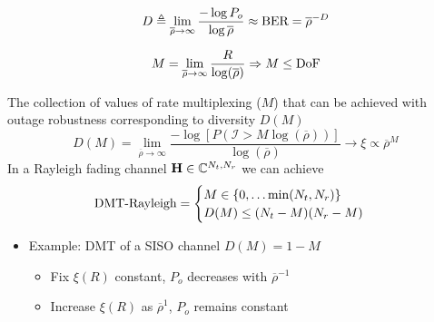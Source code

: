\documentclass[xcolor=dvipsnames,aspectratio=169]{beamer}
\begin{document}
{\begin{definition}
 $$ D \triangleq \lim_{\overline{\rho}\to\infty} \frac{-\log P_o}{\log \overline{\rho}}\approx \textnormal{BER}=\overline{\rho}^{-D}$$
\end{definition}
\begin{definition}
$$M=\lim_{\overline{\rho}\to\infty}\frac{R}{\log(\overline{\rho})}\Rightarrow M\leq \textnormal{DoF}$$
\end{definition}
\pagebreak
\begin{theorem}
The collection of values of rate multiplexing ($M$) that can be achieved with outage robustness corresponding to diversity $D(M)$
$$D(M)=\lim_{\overline{\rho}\to\infty}\frac{-\log\left[P\left(\mathcal{I}>M\log(\overline{\rho})\right)\right]}{\log(\overline{\rho})}\to \xi\propto \overline{\rho}^{M}$$
 In a Rayleigh fading channel $\mathbf{H}\in\mathbb{C}^{N_{t},N_{r}}$ we can achieve
 $$\textnormal{DMT-Rayleigh}=\begin{cases}
                            M\in\{0,\dots \min(N_{t},N_{r})\}\\
                            D(M)\leq (N_{t}-M)(N_{r}-M)
                           \end{cases}$$
\end{theorem}
 \begin{itemize}
  \item Example: DMT of a SISO channel $D(M)=1-M$
 \begin{itemize}
  \item Fix $\xi(R)$ constant, $P_o$ decreases with $\overline{\rho}^{-1}$
  \item Increase $\xi(R)$ as $\overline{\rho}^{1}$, $P_o$ remains constant
\end{itemize}
\end{itemize}

}
\end{document}
